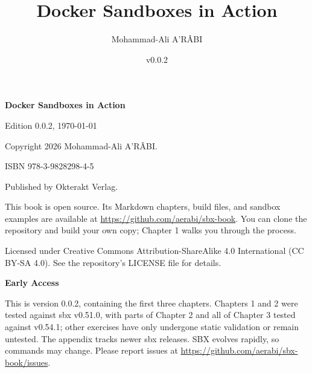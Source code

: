 \newcommand{\bookversion}{0.0.2}

\title{\bfseries {Docker Sandboxes in Action}}
\author{Mohammad-Ali A'RÂBI}
\date{v\bookversion}

\maketitle

\newpage

\textbf{Docker Sandboxes in Action}

Edition \bookversion, \today

Copyright \textcopyright{} 2026 Mohammad-Ali A'RÂBI.

ISBN 978-3-9828298-4-5

Published by Okterakt Verlag.

This book is open source. Its Markdown chapters, build files, and sandbox
examples are available at \url{https://github.com/aerabi/sbx-book}.
You can clone the repository and build your own copy; Chapter 1 walks you
through the process.

Licensed under Creative Commons Attribution-ShareAlike 4.0 International
(CC BY-SA 4.0). See the repository's LICENSE file for details.

\bigskip

\textbf{Early Access}

This is version \bookversion, containing the first three chapters. Chapters 1
and 2 were tested against sbx v0.51.0, with parts of Chapter 2 and all of
Chapter 3 tested against v0.54.1; other exercises have only undergone static
validation or remain untested. The appendix tracks newer sbx releases. SBX evolves rapidly, so commands may
change. Please report issues at \url{https://github.com/aerabi/sbx-book/issues}.

\newpage
